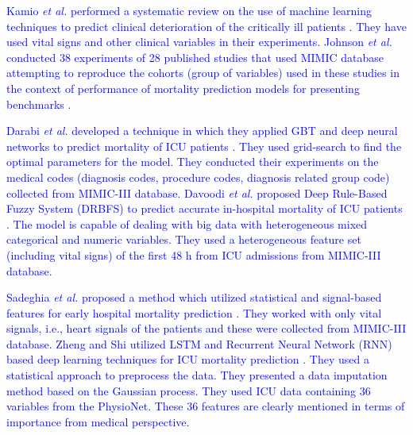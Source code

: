 \textcolor{blue}{Kamio \textit{et al.} performed a systematic review on the use of machine learning techniques to predict clinical deterioration of the critically ill patients \cite{Kamio:2017}. They have used vital signs and other clinical variables in their experiments. Johnson \textit{et al.} conducted 38 experiments of 28 published studies that used MIMIC database attempting to reproduce the cohorts (group of variables) used in these studies in the context of performance of mortality prediction models for presenting benchmarks \cite{Johnson2nd2017}.}
 
\textcolor{blue}{Darabi \textit{et al.} developed a technique in which they applied GBT and deep neural networks to predict mortality of ICU patients \cite{Darabi2018}. They used grid-search to find the optimal parameters for the model. They conducted their experiments on the medical codes (diagnosis codes, procedure codes, diagnosis related group code) collected from MIMIC-III database. Davoodi \textit{et al.} proposed Deep Rule-Based Fuzzy System (DRBFS) to predict accurate in-hospital mortality of ICU patients \cite{Davoodi2018}. The model is capable of dealing with big data with heterogeneous mixed categorical and numeric variables. They used a heterogeneous feature set (including vital signs) of the first 48 h from ICU admissions from MIMIC-III database.} 

\textcolor{blue}{Sadeghia \textit{et al.} proposed a method which utilized statistical and signal-based features for early hospital mortality prediction \cite{Sadeghi2018}. They worked with only vital signals, i.e., heart signals of the patients and these were collected from MIMIC-III database. Zheng and Shi utilized LSTM and Recurrent Neural Network (RNN) based deep learning techniques for ICU mortality prediction \cite{Zheng2018}. They used a statistical approach to preprocess the data. They presented a data imputation method based on the Gaussian process. They used ICU data containing 36 variables from the PhysioNet. These 36 features are clearly mentioned in terms of importance from medical perspective.} 

